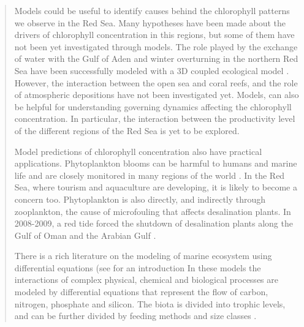 \begin{quotation}


Models could be useful to identify causes behind the chlorophyll patterns we
observe in the Red Sea. Many hypotheses have been made about the drivers of
chlorophyll concentration in this regions, but some of them have not been yet
investigated through models. The role played by the exchange of water with the
Gulf of Aden and winter overturning in the northern Red Sea have been
successfully modeled with a 3D coupled ecological model
\citep{Triantafyllou2014}. However, the interaction between the open sea and
coral reefs, and the role of atmospheric depositions have not been investigated
yet. Models, can also be helpful for understanding governing dynamics affecting
the chlorophyll concentration. In particular, the interaction between the
productivity level of the different regions of the Red Sea is yet to be
explored.

Model predictions of chlorophyll concentration also have practical
applications. Phytoplankton blooms can be harmful to humans and marine life and
are closely monitored in many regions of the world \citep{Pettersson2013}. In
the Red Sea, where tourism and aquaculture are developing, it is likely to
become a concern too. Phytoplankton is also directly, and indirectly through
zooplankton, the cause of microfouling that affects desalination plants. In
2008-2009, a red tide forced the shutdown of desalination plants along the Gulf
of Oman and the Arabian Gulf \citep{Richlen2010}.




There is a rich literature on the modeling of marine ecosystem using
differential equations (see \citet{Fennel2004} for an introduction In these
models the interactions of complex physical, chemical and biological processes
are modeled by differential equations that represent the flow of carbon,
nitrogen, phosphate and silicon. The biota is divided into trophic levels, and
can be further divided by feeding methods and size classes
\citep{Triantafyllou2014}.


\end{quotation}
